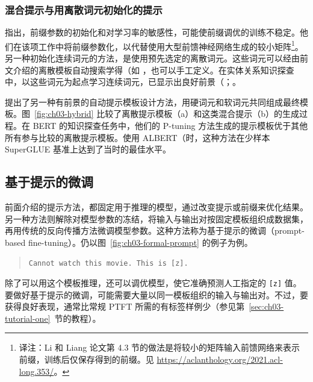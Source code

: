 
\subsubsection{混合提示与用离散词元初始化的提示}
指出，前缀参数的初始化和对学习率的敏感性，可能使前缀调优的训练不稳定。他们在该项工作中将前缀参数化，以代替使用大型前馈神经网络生成的较小矩阵\footnote{译注：Li 和 Liang 论文第 4.3 节的做法是将较小的矩阵输入前馈网络来表示前缀，训练后仅保存得到的前缀。见 \url{https://aclanthology.org/2021.acl-long.353/}。}。另一种初始化连续词元的方法，是使用预先选定的离散词元。这些词元可以经由前文介绍的离散模板自动搜索学得（如 ，也可以手工定义。在实体关系知识探查中，以这些词元为起点学习连续词元，已显示出良好前景（；。

提出了另一种有前景的自动提示模板设计方法，用硬词元和软词元共同组成最终模板。图~\ref{fig:ch03-hybrid} 比较了离散提示模板（a）和这类混合提示（b）的生成过程。在 BERT 的知识探查任务中，他们的 P-tuning 方法生成的提示模板优于其他所有参与比较的离散提示模板。使用 ALBERT（时，这种方法在少样本 SuperGLUE 基准上达到了当时的最佳水平。


\subsection{基于提示的微调}
\label{sec:ch03-prompt-finetuning}
前面介绍的提示方法，都固定用于推理的模型，通过改变提示或前缀来优化结果。另一种方法则解除对模型参数的冻结，将输入与输出对按固定模板组织成数据集，再用传统的反向传播方法微调模型参数。这种方法称为基于提示的微调（prompt-based fine-tuning）。仍以图~\ref{fig:ch03-formal-prompt} 的例子为例。
\begin{quote}
\texttt{Cannot watch this movie. This is [z].}
\end{quote}
除了可以用这个模板推理，还可以调优模型，使它准确预测人工指定的 \texttt{[z]} 值。要做好基于提示的微调，可能需要大量以同一模板组织的输入与输出对。不过，要获得良好表现，通常比常规 PTFT 所需的有标签样例少（参见第~\ref{sec:ch03-tutorial-one}~节的教程）。

